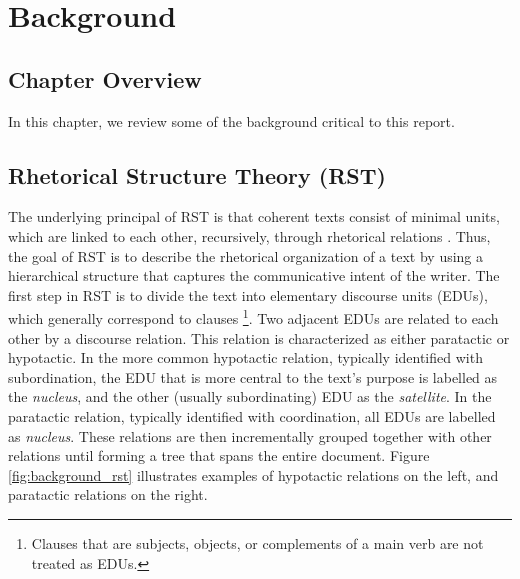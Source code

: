 \chapter{Background}
\label{ch:background}

\section{Chapter Overview}

In this chapter, we review some of the background critical to this report.

\section{Rhetorical Structure Theory (RST)}
The underlying principal of RST is that coherent texts consist of minimal units, which are linked to each other, recursively, through rhetorical relations \cite{Mann:1988}. Thus, the goal of RST is to describe the rhetorical organization of a text by using a hierarchical structure that captures the communicative intent of the writer. The first step in RST is to divide the text into elementary discourse units (EDUs), which generally correspond to clauses \footnote{Clauses that are subjects, objects,
or complements of a main verb are not treated as EDUs.}. Two adjacent EDUs are related to each other by a discourse relation. This relation is characterized as either paratactic or hypotactic. In the more common hypotactic relation, typically identified with subordination, the EDU that is more central to the text's purpose is labelled as the \textit{nucleus}, and the other (usually subordinating) EDU as the \textit{satellite}. In the paratactic relation, typically identified with coordination, all EDUs are labelled as \textit{nucleus}. These relations are then incrementally grouped together with other relations until forming a tree that spans the entire document.
Figure \ref{fig:background_rst} illustrates  examples of hypotactic relations on the left, and paratactic relations on the right.

